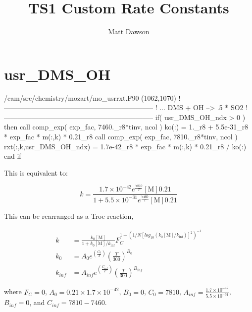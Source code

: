 \documentclass[titlepage]{article}
\begin{document}
\title{TS1 Custom Rate Constants}
\author{Matt Dawson}
\maketitle


\section{usr\_DMS\_OH}

\begin{blockcode}[commandchars=\\\{\}]
\color{gray}/cam/src/chemistry/mozart/mo_usrrxt.F90 (1062,1070)
!-----------------------------------------------------------------
!       ... DMS + OH  --> .5 * SO2
!-----------------------------------------------------------------
       if( usr_DMS_OH_ndx > 0 ) then
          call comp_exp( exp_fac, 7460._r8*tinv, ncol )
          ko(:) = 1._r8 + 5.5e-31_r8 * exp_fac * m(:,k) * 0.21_r8
          call comp_exp( exp_fac, 7810._r8*tinv, ncol )
          rxt(:,k,usr_DMS_OH_ndx) = 1.7e-42_r8 * exp_fac * m(:,k) * 0.21_r8 / ko(:)
       end if
\end{blockcode}

This is equivalent to:

\begin{equation}
k = \frac{1.7 \times 10^{-42} e^{\frac{7810}{T}} [\mbox{M}] 0.21}{1 + 5.5 \times 10^{-31} e^{\frac{7460}{T}} [\mbox{M}] 0.21 }
\end{equation}

This can be rearranged as a Troe reaction,

\begin{equation}
\begin{split}
k & = \frac{k_0[\mbox{M}]}{1+k_0[\mbox{M}]/k_{\inf}}F_C^{1+(1/N[log_{10}(k_0[\mbox{M}]/k_{\inf})]^2)^{-1}} \\
k_0 & = A_0 e^{\left( \frac{C_0}{T} \right)} \left( \frac{T}{300} \right)^{B_0} \\
k_{inf} & = A_{inf} e^{\left( \frac{C_{inf}}{T} \right)} \left( \frac{T}{300} \right)^{B_{inf}}
\end{split}
\end{equation}

\noindent where $F_C = 0$, $A_0 = 0.21 \times 1.7 \times 10^{-42}$, $B_0 = 0$, $C_0 = 7810$, $A_{inf} = \frac{1.7 \times 10^{-42}}{5.5 \times 10^{-31}}$, $B_{inf} = 0$, and $C_{inf} = 7810-7460$.
\end{document}
